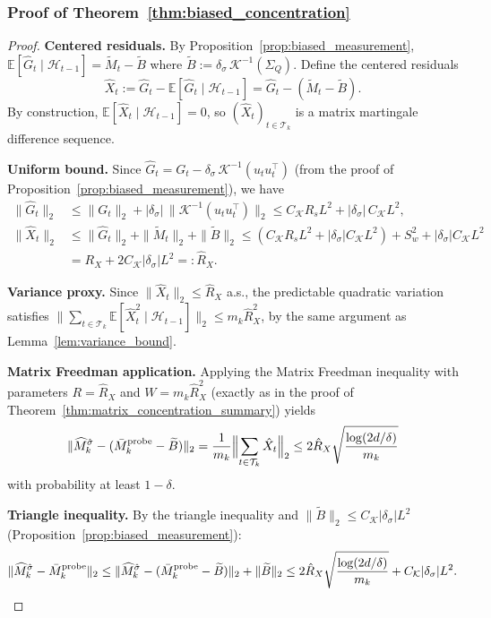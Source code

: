 \documentclass{article}
\newcommand{\E}{\mathbb{E}}
\newcommand{\cH}{\mathcal{H}}
\newcommand{\cT}{\mathcal{T}}
\begin{document}
\subsubsection{Proof of Theorem~\ref{thm:biased_concentration}}
\label{proof:biased_concentration}

\begin{proof}
\textbf{Centered residuals.}
By Proposition~\ref{prop:biased_measurement}, $\E[\hat G_t \mid \cH_{t-1}] = \widetilde M_t - \widetilde B$ where $\widetilde B := \delta_\sigma\,\mathcal K^{-1}(\Sigma_Q)$.  Define the centered residuals
\[
\hat X_t := \hat G_t - \E[\hat G_t \mid \cH_{t-1}] = \hat G_t - (\widetilde M_t - \widetilde B).
\]
By construction, $\E[\hat X_t \mid \cH_{t-1}] = 0$, so $(\hat X_t)_{t \in \cT_k}$ is a matrix martingale difference sequence.

\textbf{Uniform bound.}
Since $\hat G_t = G_t - \delta_\sigma\,\mathcal K^{-1}(u_t u_t^\top)$ (from the proof of Proposition~\ref{prop:biased_measurement}), we have
\begin{align*}
\|\hat G_t\|_2 &\le \|G_t\|_2 + |\delta_\sigma|\,\|\mathcal K^{-1}(u_t u_t^\top)\|_2 \le C_{\mathcal K}R_s L^2 + |\delta_\sigma|\,C_{\mathcal K} L^2, \\
\|\hat X_t\|_2 &\le \|\hat G_t\|_2 + \|\widetilde M_t\|_2 + \|\widetilde B\|_2 \le (C_{\mathcal K}R_s L^2 + |\delta_\sigma| C_{\mathcal K} L^2) + S_w^2 + |\delta_\sigma| C_{\mathcal K} L^2 \\
&= R_X + 2C_{\mathcal K}|\delta_\sigma| L^2 =: \hat R_X.
\end{align*}

\textbf{Variance proxy.}
Since $\|\hat X_t\|_2 \le \hat R_X$ a.s., the predictable quadratic variation satisfies $\|\sum_{t \in \cT_k} \E[\hat X_t^2 \mid \cH_{t-1}]\|_2 \le m_k \hat R_X^2$, by the same argument as Lemma~\ref{lem:variance_bound}.

\textbf{Matrix Freedman application.}
Applying the Matrix Freedman inequality with parameters $R = \hat R_X$ and $W = m_k \hat R_X^2$ (exactly as in the proof of Theorem~\ref{thm:matrix_concentration_summary}) yields
\[
\|\widehat M_k^{\hat\sigma} - (\bar M_k^{\mathrm{probe}} - \widetilde B)\|_2
= \frac{1}{m_k}\Bigl\|\sum_{t \in \cT_k} \hat X_t\Bigr\|_2
\le 2\hat R_X\sqrt{\frac{\log(2d/\delta)}{m_k}}
\]
with probability at least $1-\delta$.

\textbf{Triangle inequality.}
By the triangle inequality and $\|\widetilde B\|_2 \le C_{\mathcal K}|\delta_\sigma| L^2$ (Proposition~\ref{prop:biased_measurement}):
\[
\|\widehat M_k^{\hat\sigma} - \bar M_k^{\mathrm{probe}}\|_2
\le \|\widehat M_k^{\hat\sigma} - (\bar M_k^{\mathrm{probe}} - \widetilde B)\|_2 + \|\widetilde B\|_2
\le 2\hat R_X\sqrt{\frac{\log(2d/\delta)}{m_k}} + C_{\mathcal K}|\delta_\sigma| L^2. \qedhere
\]
\end{proof}
\end{document}
